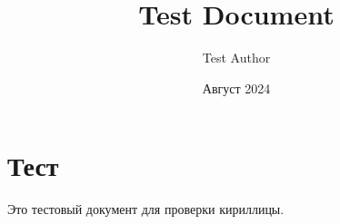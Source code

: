 \documentclass[11pt,a4paper]{article}
\title{Test Document}
\author{Test Author}
\date{Август 2024}
\begin{document}
\maketitle

\section{Тест}

Это тестовый документ для проверки кириллицы.
\end{document}
